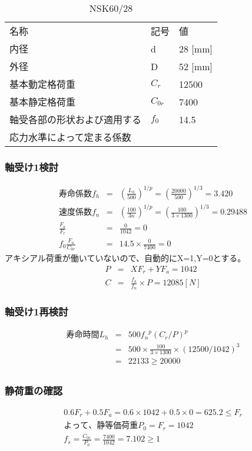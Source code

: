 \begin{table}[htb]
\begin{center}
  \caption{NSK60/28}
  \begin{tabular}{lll} \hline
名称&記号&値\\
内径& d &28 [mm]\\
外径& D &52 [mm]\\
基本動定格荷重&$C_{r}$&12500\\
基本静定格荷重&$C_{0r}$&7400\\
軸受各部の形状および適用する&$f_0$&14.5\\
応力水準によって定まる係数&&\\
\hline
  \end{tabular}
\end{center}
\end{table}


\subsubsection{軸受け1検討}
\begin{eqnarray}
寿命係数f_h &=& \left( \frac{L_h}{500} \right)^{1/p} = \left( \frac{20000}{500} \right)^{1/3} = 3.420\\
速度係数f_n &=& \left( \frac{100}{3n} \right)^{1/p} = \left( \frac{100}{3 \times 1300} \right)^{1/3} = 0.29488\\
\frac{F_a}{F_r} &=& \frac{0}{1042}=0\\
f_0\frac{F_a}{C_{0r}}&=& 14.5 \times \frac{0}{7400} = 0
\end{eqnarray}
アキシアル荷重が働いていないので、自動的にX=1,Y=0とする。\\
\begin{eqnarray}
P &=& XF_r+YF_a = 1042\\
C &=& \frac{f_h}{f_n} \times P = 12085[N]
\end{eqnarray}

\subsubsection{軸受け1再検討}
\begin{eqnarray}
寿命時間L_h &=& 500{f_n}^p(C_r/P)^p\\
           &=& 500 \times \frac{100}{3 \times 1300} \times (12500/1042)^3\\
           &=& 22133 \geq 20000\\
\end{eqnarray}

\subsubsection{静荷重の確認}
\begin{eqnarray}
0.6F_r+0.5F_a=0.6 \times 1042 + 0.5 \times 0 = 625.2 \leq F_r\\
よって、静等価荷重P_0 = F_r=1042\\
f_s = \frac{C_{0r}}{P_0} = \frac{7400}{1042} = 7.102\geq 1
\end{eqnarray}

